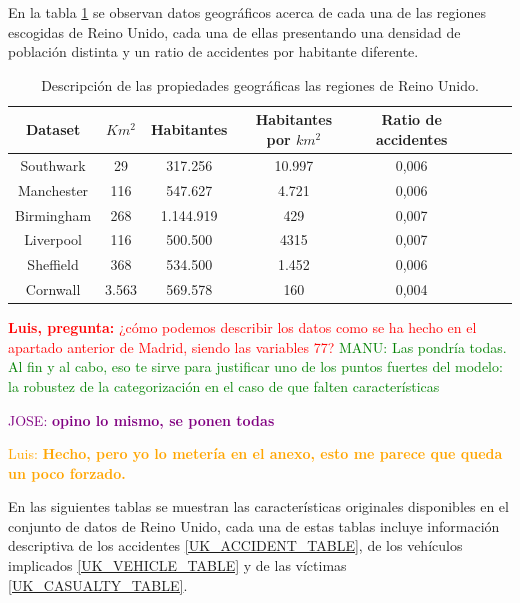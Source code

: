\documentclass{uathesis-es}
\begin{document}
{		%
		
		En la tabla \ref{UK_statistics} se observan datos geográficos acerca de cada una de las regiones escogidas de Reino Unido, cada una de ellas presentando una densidad de población distinta y un ratio de accidentes por habitante diferente.
		
		\begin{table}[ht]
			\begin{center}
				\begin{tabular}{|c|c||c|c|c|c|c|c|}
					\hline
					\textbf{Dataset} & \textbf{$Km^2$} & \textbf{Habitantes} & \textbf{Habitantes por $km^2$} & \textbf{Ratio de accidentes}
					\\ \hline \hline
					Southwark   &  29   &   317.256  & 10.997  & 0,006 \\ \hline
					Manchester  &  116  &   547.627  &  4.721  & 0,006 \\ \hline
					Birmingham  &  268  & 1.144.919  &    429  & 0,007 \\ \hline
					Liverpool   &  116  &   500.500  &   4315  & 0,007 \\ \hline
					Sheffield   &  368  &   534.500  &  1.452  & 0,006  \\ \hline
					Cornwall    & 3.563 &   569.578  &    160  & 0,004 \\ \hline
				\end{tabular}
			\end{center}
			\caption{Descripción de las propiedades geográficas las regiones de Reino Unido.}
			\label{UK_statistics}
		\end{table}
		
		
		\textcolor{red}{\textbf{Luis, pregunta:} ¿cómo podemos describir los datos como se ha hecho en el apartado anterior de Madrid, siendo las variables 77?}
		\textcolor{green}{MANU: Las pondría todas. Al fin y al cabo, eso te sirve para justificar uno de los puntos fuertes del modelo: la robustez de la categorización en el caso de que falten características}
		
		\textcolor{purple}{JOSE: \textbf{opino lo mismo, se ponen todas}}
		
		\textcolor{orange}{Luis: \textbf{Hecho, pero yo lo metería en el anexo, esto me parece que queda un poco forzado.}}
		
		
		En las siguientes tablas se muestran las características originales disponibles en el conjunto de datos de Reino Unido, cada una de estas tablas incluye información descriptiva de los accidentes \ref{UK_ACCIDENT_TABLE}, de los vehículos implicados \ref{UK_VEHICLE_TABLE} y de las víctimas \ref{UK_CASUALTY_TABLE}.
		
}
\end{document}
